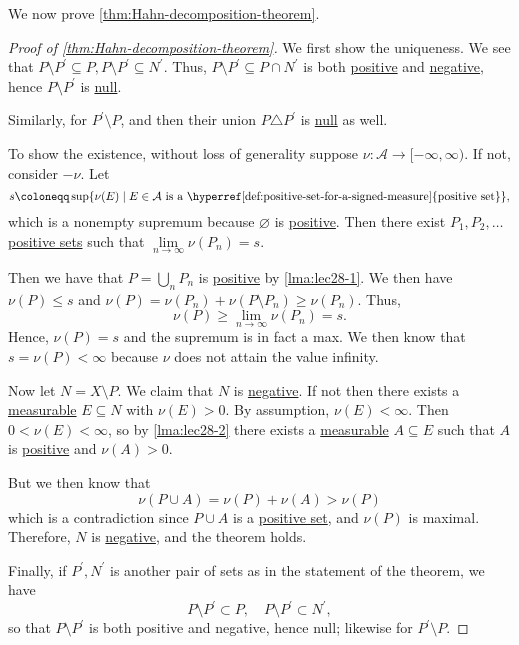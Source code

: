 We now prove \autoref{thm:Hahn-decomposition-theorem}.
\begin{proof}[Proof of \autoref{thm:Hahn-decomposition-theorem}]
  We first show the uniqueness. We see that \(P \setminus P^\prime \subseteq P, P \setminus P^\prime  \subseteq N^\prime \). Thus, \(P \setminus P^\prime  \subseteq P \cap N^\prime \)
  is both \hyperref[def:positive-set-for-a-signed-measure]{positive} and \hyperref[def:negative-set-for-a-signed-measure]{negative}, hence \(P \setminus P^\prime\) is \hyperref[def:null-set-for-a-signed-measure]{null}.

  Similarly, for \(P^\prime \setminus P\), and then their union \(P \triangle P^\prime\) is \hyperref[def:null-set-for-a-signed-measure]{null} as well.

  \par To show the existence, without loss of generality suppose \(\nu \colon \mathcal{A} \to [-\infty,\infty)\). If not, consider \(-\nu\). Let
  \[
    s \coloneqq \sup\{\nu(E) \mid E \in \mathcal{A} \text{ is a \hyperref[def:positive-set-for-a-signed-measure]{positive set}}\},
  \]
  which is a nonempty supremum because \(\varnothing\) is \hyperref[def:positive-set-for-a-signed-measure]{positive}. Then there exist
  \(P_1,P_2,\ldots\) \hyperref[def:positive-set-for-a-signed-measure]{positive sets} such that \(\lim\limits_{n\to \infty } \nu(P_n) = s\).

  Then we have that \(P = \bigcup_n P_n\) is \hyperref[def:positive-set-for-a-signed-measure]{positive} by \autoref{lma:lec28-1}.
  We then have \(\nu(P) \leq s\) and \(\nu(P) = \nu(P_n) + \nu(P \setminus P_n) \geq \nu(P_n)\). Thus,
  \[
    \nu(P) \geq \lim_{n \to \infty} \nu(P_n) = s.
  \]
  Hence, \(\nu(P) = s\) and the supremum is in fact a max. We then know that \(s = \nu(P) < \infty\) because \(\nu\) does not attain the value infinity.

  Now let \(N = X \setminus P\). We claim that \(N\) is \hyperref[def:negative-set-for-a-signed-measure]{negative}. If not then there exists a
  \hyperref[def:measurable-set]{measurable} \(E \subseteq N\) with \(\nu(E) > 0\).
  By assumption, \(\nu(E) < \infty\). Then \(0 < \nu(E) < \infty\), so by \autoref{lma:lec28-2} there exists a \hyperref[def:measurable-set]{measurable}
  \(A \subseteq E\) such that \(A\) is \hyperref[def:positive-set-for-a-signed-measure]{positive} and \(\nu(A) > 0\).

  But we then know that
  \[
    \nu(P \cup A) = \nu(P) + \nu(A) > \nu(P)
  \]
  which is a contradiction since \(P \cup A\) is a \hyperref[def:positive-set-for-a-signed-measure]{positive set}, and \(\nu(P)\) is maximal. Therefore,
  \(N\) is \hyperref[def:negative-set-for-a-signed-measure]{negative}, and the theorem holds.

  \par Finally, if \(P^\prime , N^\prime \) is another pair of sets as in the statement of the theorem, we have
  \[
    P\setminus P^\prime \subset P,\quad P\setminus P^\prime \subset N^\prime,
  \]
  so that \(P\setminus P^\prime \) is both positive and negative, hence null; likewise for \(P^\prime \setminus P\).
\end{proof}


